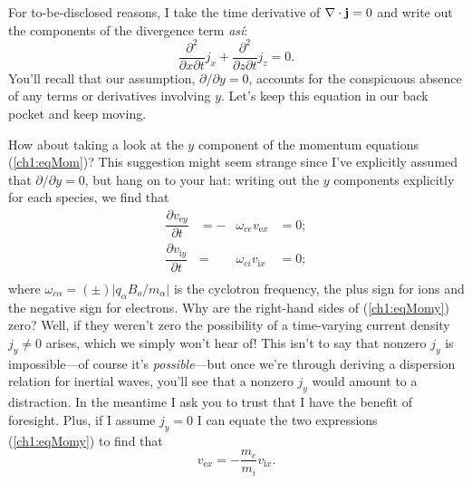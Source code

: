 For to-be-disclosed reasons, I take the time derivative of ${\bf \nabla} \cdot
\mathbf{j} = 0$ and write out the components of the divergence term
\emph{as\'{i}}:
\begin{equation} \label{ch1:eqCont2} \dfrac{\partial^2}{\partial x \partial t}
  j_x + \dfrac{\partial^2}{\partial z \partial t} j_z = 0.
\end{equation}
You'll recall that our assumption, $\partial / \partial y = 0$, accounts for the
conspicuous absence of any terms or derivatives involving $y$. Let's keep this
equation in our back pocket and keep moving.

How about taking a look at the $y$ component of the momentum equations
(\ref{ch1:eqMom})? This suggestion might seem strange since I've explicitly
assumed that $\partial / \partial y = 0$, but hang on to your hat: writing out
the $y$ components explicitly for each species, we find that
\begin{equation} 
  \begin{alignedat}{2}
    \label{ch1:eqMomy} \dfrac{\partial v_{\textrm{e}y}}{\partial t} &=
    - &\omega_{ce} v_{\textrm{e}x} &= 0; \\
    \dfrac{\partial v_{\textrm{i}y}}{\partial t} &=
    &\omega_{ci} v_{\textrm{i}x} &= 0; \\
  \end{alignedat}
\end{equation}
where $\omega_{c \alpha} = ( \pm ) \vert q_\alpha B_o /m_\alpha \vert$ is the
cyclotron frequency, the plus sign for ions and the negative sign for electrons.
Why are the right-hand sides of (\ref{ch1:eqMomy}) zero?  Well, if they weren't
zero the possibility of a time-varying current density $j_y \neq 0$ arises,
which we simply won't hear of! This isn't to say that nonzero $j_y$ is
impossible---of course it's \emph{possible}---but once we're through deriving a
dispersion relation for inertial \Alf waves, you'll see that a nonzero $j_y$
would amount to a distraction. In the meantime I ask you to trust that I have
the benefit of foresight. Plus, if I assume $j_y = 0$ I can equate the two
expressions (\ref{ch1:eqMomy}) to find that
\begin{equation} 
  v_{\textrm{e}x} = - \dfrac{m_e}{m_i} v_{\textrm{i}x}.
\end{equation}
